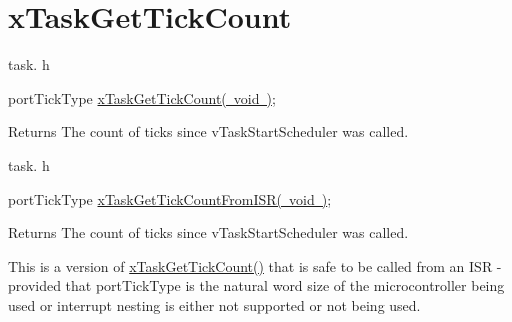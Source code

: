 \hypertarget{group__x_task_get_tick_count}{}\section{x\+Task\+Get\+Tick\+Count}
\label{group__x_task_get_tick_count}
task. h 
\begin{DoxyPre}portTickType \mbox{\hyperlink{task_8h_a25ba1c4490c7e3ae11bc1e25192b12dc}{xTaskGetTickCount( void )}};\end{DoxyPre}


\begin{DoxyReturn}{Returns}
The count of ticks since v\+Task\+Start\+Scheduler was called.
\end{DoxyReturn}
task. h 
\begin{DoxyPre}portTickType \mbox{\hyperlink{task_8h_a9b3e0b8c2ce6d35ec82b1551139a95a4}{xTaskGetTickCountFromISR( void )}};\end{DoxyPre}


\begin{DoxyReturn}{Returns}
The count of ticks since v\+Task\+Start\+Scheduler was called.
\end{DoxyReturn}
This is a version of \mbox{\hyperlink{task_8h_a25ba1c4490c7e3ae11bc1e25192b12dc}{x\+Task\+Get\+Tick\+Count()}} that is safe to be called from an I\+SR -\/ provided that port\+Tick\+Type is the natural word size of the microcontroller being used or interrupt nesting is either not supported or not being used. 